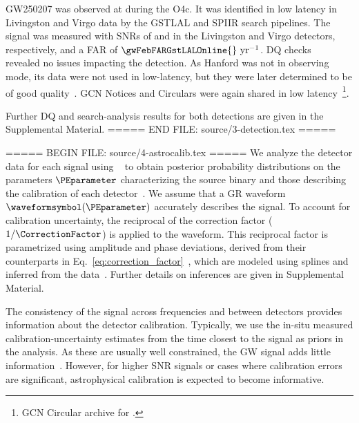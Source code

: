 \ac{GW250207} was observed at \gwFebTime{} during the \ac{O4c}.
It was identified in low latency in Livingston and Virgo data by the \ac{GSTLAL} and \ac{SPIIR} search pipelines.
The signal was measured with \acp{SNR} of \gwFebSNRLLOGSTLALOnline{} and \gwFebSNRVirgoGSTLALOnline{} in the Livingston and Virgo detectors, respectively, and a \ac{FAR} of $\gwFebFARGstLALOnline{}~\mathrm{yr^{-1}}$.
\ac{DQ} checks~\cite{Soni:2024kkz} revealed no issues impacting the detection.
As Hanford was not in observing mode, its data were not used in low-latency, but they were later determined to be of good quality~\cite{Betzwieser:2025aaa}.
\Ac{GCN} Notices and Circulars were again shared in low latency~\footnote{\Ac{GCN} Circular archive for \href{https://gcn.nasa.gov/circulars/events/ligovirgokagra-s250207bg}{\gwFebSID}.}.

Further \ac{DQ} and search-analysis results for both detections are given in the Supplemental Material\citesupp.
===== END FILE: source/3-detection.tex =====

===== BEGIN FILE: source/4-astrocalib.tex =====
We analyze the detector data for each signal using \BILBY{}~\cite{Ashton:2018jfp,Romero-Shaw:2020owr} to obtain posterior probability distributions on the parameters $\PEparameter$ characterizing the source binary and those describing the calibration of each detector~\cite{LIGOScientific:2025yae}.
We assume that a \ac{GR} waveform $\waveformsymbol(\PEparameter)$ accurately describes the signal.
To account for calibration uncertainty, the reciprocal of the correction factor ($1/\CorrectionFactor$) is applied to the waveform.
This reciprocal factor is parametrized using amplitude and phase deviations, derived from their counterparts in Eq.~\eqref{eq:correction_factor}~\cite{LIGOScientific:2025yae,Baka:2025aaa}, which are modeled using splines and inferred from the data~\cite{Farr:2014aab,TheLIGOScientific:2016wfe,LIGOScientific:2025yae}.
Further details on inferences are given in Supplemental Material\citesupp.

The consistency of the signal across frequencies and between detectors provides information about the detector calibration.
Typically, we use the in-situ measured calibration-uncertainty estimates from the time closest to the signal as priors in the analysis.
As these are usually well constrained, the \ac{GW} signal adds little information~\cite{Essick:2019dow,LIGOScientific:2025slb}.
However, for higher \ac{SNR} signals or cases where calibration errors are significant, astrophysical calibration is expected to become informative.

